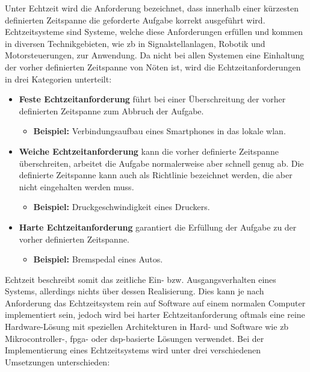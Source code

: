 \documentclass[../EDF Master Thesis.tex]{subfiles}
\begin{document}
    Unter Echtzeit wird die Anforderung bezeichnet, dass innerhalb einer kürzesten definierten Zeitspanne die geforderte Aufgabe korrekt ausgeführt wird.
    Echtzeitsysteme sind Systeme, welche diese Anforderungen erfüllen und kommen in diversen Technikgebieten, wie \ac{zb} in Signalstellanlagen, Robotik und Motorsteuerungen, zur Anwendung.
    Da nicht bei allen Systemen eine Einhaltung der vorher definierten Zeitspanne von Nöten ist, wird die Echtzeitanforderungen in drei Kategorien unterteilt:
    \begin{itemize}
        \item \textbf{Feste Echtzeitanforderung} führt bei einer Überschreitung der vorher definierten Zeitspanne zum Abbruch der Aufgabe.
            \begin{itemize}
                \item \textbf{Beispiel:} Verbindungsaufbau eines Smartphones in das lokale \ac{wlan}.
            \end{itemize}
        \item \textbf{Weiche Echtzeitanforderung} kann die vorher definierte Zeitspanne überschreiten, arbeitet die Aufgabe normalerweise aber schnell genug ab.
            Die definierte Zeitspanne kann auch als Richtlinie bezeichnet werden, die aber nicht eingehalten werden muss.
            \begin{itemize}
                \item \textbf{Beispiel:} Druckgeschwindigkeit eines Druckers.
            \end{itemize}
        \item \textbf{Harte Echtzeitanforderung} garantiert die Erfüllung der Aufgabe zu der vorher definierten Zeitspanne.
        \begin{itemize}
            \item \textbf{Beispiel:} Bremspedal eines Autos.
        \end{itemize}
    \end{itemize}
    Echtzeit beschreibt somit das zeitliche Ein- bzw. Ausgangsverhalten eines Systems, allerdings nichts über dessen Realisierung.
    Dies kann je nach Anforderung das Echtzeitsystem rein auf Software auf einem normalen Computer implementiert sein, jedoch wird bei harter Echtzeitanforderung oftmals eine reine Hardware-Lösung mit speziellen Architekturen in Hard- und Software wie \ac{zb} Mikrocontroller-, \ac{fpga}- oder \ac{dsp}-basierte Lösungen verwendet. 
    Bei der Implementierung eines Echtzeitsystems wird unter drei verschiedenen Umsetzungen unterschieden:
\end{document}

